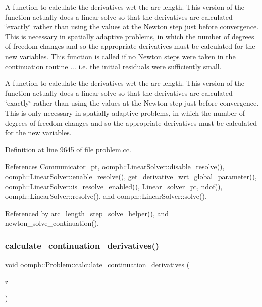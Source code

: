 A function to calculate the derivatives wrt the arc-\/length. This version of the function actually does a linear solve so that the derivatives are calculated \char`\"{}exactly\char`\"{} rather than using the values at the Newton step just before convergence. This is necessary in spatially adaptive problems, in which the number of degrees of freedom changes and so the appropriate derivatives must be calculated for the new variables. This function is called if no Newton steps were taken in the continuation routine ... i.\+e. the initial residuals were sufficiently small. 

A function to calculate the derivatives wrt the arc-\/length. This version of the function actually does a linear solve so that the derivatives are calculated \char`\"{}exactly\char`\"{} rather than using the values at the Newton step just before convergence. This is only necessary in spatially adaptive problems, in which the number of degrees of freedom changes and so the appropriate derivatives must be calculated for the new variables. 

Definition at line 9645 of file problem.\+cc.



References Communicator\+\_\+pt, oomph\+::\+Linear\+Solver\+::disable\+\_\+resolve(), oomph\+::\+Linear\+Solver\+::enable\+\_\+resolve(), get\+\_\+derivative\+\_\+wrt\+\_\+global\+\_\+parameter(), oomph\+::\+Linear\+Solver\+::is\+\_\+resolve\+\_\+enabled(), Linear\+\_\+solver\+\_\+pt, ndof(), oomph\+::\+Linear\+Solver\+::resolve(), and oomph\+::\+Linear\+Solver\+::solve().



Referenced by arc\+\_\+length\+\_\+step\+\_\+solve\+\_\+helper(), and newton\+\_\+solve\+\_\+continuation().

\mbox{\label{classoomph_1_1Problem_a58edae16dc24830521b0df67452db1f7}} 
\subsubsection{\texorpdfstring{calculate\+\_\+continuation\+\_\+derivatives()}{calculate\_continuation\_derivatives()}\hspace{0.1cm}{\footnotesize\ttfamily [2/2]}}
{\footnotesize\ttfamily void oomph\+::\+Problem\+::calculate\+\_\+continuation\+\_\+derivatives (\begin{DoxyParamCaption}\item[{const \hyperlink{classoomph_1_1DoubleVector}{Double\+Vector} \&}]{z }\end{DoxyParamCaption})\hspace{0.3cm}{\ttfamily [protected]}}



